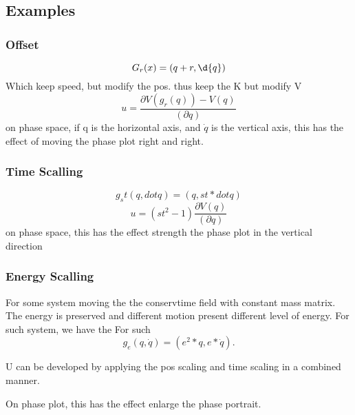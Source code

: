 \subsection{Examples}

\subsubsection*{Offset}
\[
G_r(x)=(q+r,\d{q})
\]
Which keep speed, but modify the pos. thus keep the K but modify V
\begin{equation}
u=\frac{\partial V(g_r(q))-V(q)}{(\partial q)}
\end{equation}
on phase space, if q is the horizontal axis, and $\dot{q}$ is the vertical axis, this has the effect of moving the phase plot right and right.

\subsubsection*{Time Scalling}
\begin{equation}
g_st(q,dot{q})=(q,st*dot{q})
\end{equation}
\begin{equation}
u=(st^2-1) \frac{\partial V(q)}{(\partial q)}
\end{equation}
on phase space, this has the effect strength the phase plot in the vertical direction

\subsubsection*{Energy Scalling}

For some system moving the the conservtime field with constant mass matrix.
The energy is preserved and different motion present different level of energy.
For such system, we have the 
For such
\[
g_e(q,\dot{q})=(e^2*q,e*\dot{q}).
\]

U can be developed by applying the pos scaling and time scaling in a combined manner.

On phase plot, this has the effect enlarge the phase portrait.
